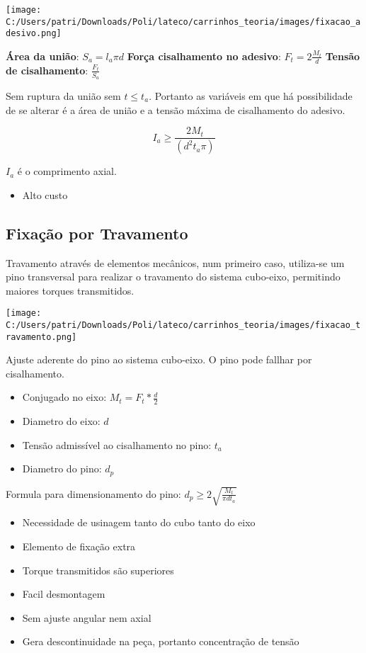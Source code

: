 \texttt{[image: C:/Users/patri/Downloads/Poli/lateco/carrinhos\_teoria/images/fixacao\_adesivo.png]}

\textbf{Área da união}: $S_a = l_a \pi d$
\textbf{Força cisalhamento no adesivo}: $F_t = 2\frac{M_t}{d}$
\textbf{Tensão de cisalhamento}: $\frac{F_t}{S_a}$

Sem ruptura da união sem $t \leq t_a$. Portanto as variáveis em que há possibilidade de se alterar é a área de união e a tensão máxima de cisalhamento do adesivo. 

$$I_a \geq \frac{2M_t}{(d^2t_a\pi)} $$

$I_a$ é o comprimento axial.

\begin{itemize}
	\item Alto custo
\end{itemize}

\subsection{Fixação por Travamento}

Travamento através de elementos mecânicos, num primeiro caso, utiliza-se um pino transversal para realizar o travamento do sistema cubo-eixo, permitindo maiores torques transmitidos.

\texttt{[image: C:/Users/patri/Downloads/Poli/lateco/carrinhos\_teoria/images/fixacao\_travamento.png]}

Ajuste aderente do pino ao sistema cubo-eixo. O pino pode fallhar por cisalhamento.

\begin{itemize}
	\item Conjugado no eixo: $M_t = F_t * \frac{d}{2}$
	\item Diametro do eixo: $d$
	\item Tensão admissível ao cisalhamento no pino: $t_a$
	\item Diametro do pino: $d_p$
\end{itemize}

Formula para dimensionamento do pino:
$\boxed{d_p \geq 2\sqrt{\frac{M_t}{\pi d t_a}} }$

\begin{itemize}
	\item Necessidade de usinagem tanto do cubo tanto do eixo
	\item Elemento de fixação extra
	\item Torque transmitidos são superiores
	\item Facil desmontagem
	\item Sem ajuste angular nem axial
	\item Gera descontinuidade na peça, portanto concentração de tensão
\end{itemize}

